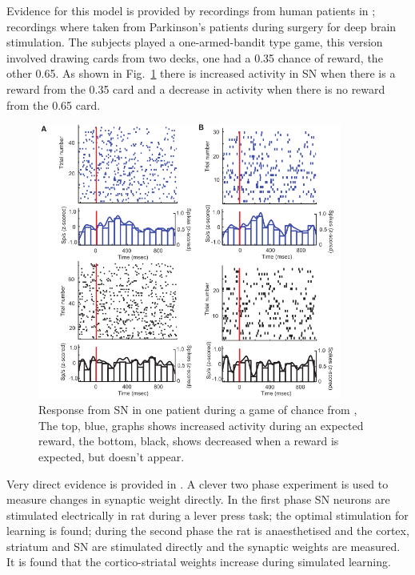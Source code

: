 \documentclass[11pt,a4paper]{scrartcl}
\begin{document}
Evidence for this model is provided by recordings from human patients
in \cite{ZaghloulEtAl2009a}; recordings where taken from Parkinson's
patients during surgery for deep brain stimulation. The subjects
played a one-armed-bandit type game, this version involved drawing
cards from two decks, one had a 0.35 chance of reward, the other
0.65. As shown in Fig.~\ref{fig:human} there is increased activity in
SN when there is a reward from the 0.35 card and a decrease in
activity when there is no reward from the 0.65 card.


\begin{figure}
\begin{center}
\includegraphics[width=10cm]{human.png}%
\end{center}
\caption{Response from SN in one patient during a game of chance from \cite{ZaghloulEtAl2009a}, The top, blue, graphs shows increased activity during an expected reward, the bottom, black, shows decreased when a reward is expected, but doesn't appear. \label{fig:human}}
\end{figure}

Very direct evidence is provided in
\cite{ReynoldsHylandWickens2001a}. A clever two phase experiment is
used to measure changes in synaptic weight directly. In the first
phase SN neurons are stimulated electrically in rat during a lever
press task; the optimal stimulation for learning is found; during the
second phase the rat is anaesthetised and the cortex, striatum and SN
are stimulated directly and the synaptic weights are measured. It is
found that the cortico-striatal weights increase during simulated
learning.

\end{document}
